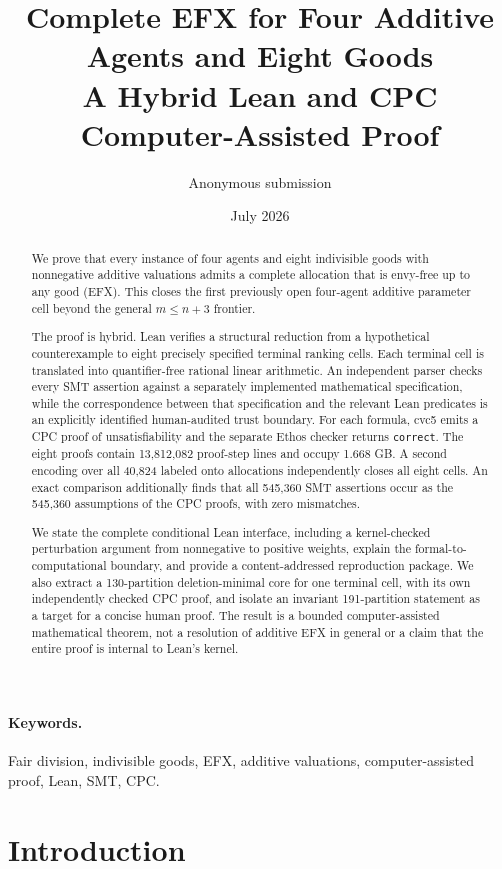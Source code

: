 \documentclass[11pt]{article}
\title{\textbf{Complete EFX for Four Additive Agents and Eight Goods}\\
\large A Hybrid Lean and CPC Computer-Assisted Proof}
\author{Anonymous submission}
\date{July 2026}
\theoremstyle{definition}
\begin{document}
\maketitle

\begin{abstract}
We prove that every instance of four agents and eight indivisible goods with
nonnegative additive valuations admits a complete allocation that is
envy-free up to any good (EFX). This closes the first previously open
four-agent additive parameter cell beyond the general $m\le n+3$ frontier.

The proof is hybrid. Lean verifies a structural reduction from a hypothetical
counterexample to eight precisely specified terminal ranking cells. Each
terminal cell is translated into quantifier-free rational linear arithmetic.
An independent parser checks every SMT assertion against a separately
implemented mathematical specification, while the correspondence between
that specification and the relevant Lean predicates is an explicitly
identified human-audited trust boundary. For each formula, cvc5 emits a CPC
proof of unsatisfiability and the separate Ethos checker returns
\texttt{correct}. The eight proofs contain 13,812,082 proof-step lines and
occupy 1.668 GB. A second encoding over all 40,824 labeled onto allocations
independently closes all eight cells. An exact comparison additionally finds
that all 545,360 SMT assertions occur as the 545,360 assumptions of the CPC
proofs, with zero mismatches.

We state the complete conditional Lean interface, including a kernel-checked
perturbation argument from nonnegative to positive weights, explain the
formal-to-computational boundary, and provide a content-addressed
reproduction package. We also extract a 130-partition deletion-minimal core
for one terminal cell, with its own independently checked CPC proof, and
isolate an invariant 191-partition statement as a target for a concise human
proof. The result is a bounded computer-assisted mathematical theorem, not a
resolution of additive EFX in general or a claim that the entire proof is
internal to Lean's kernel.
\end{abstract}

\paragraph{Keywords.}
Fair division, indivisible goods, EFX, additive valuations, computer-assisted
proof, Lean, SMT, CPC.

\section{Introduction}\label{sec:introduction}
\end{document}
